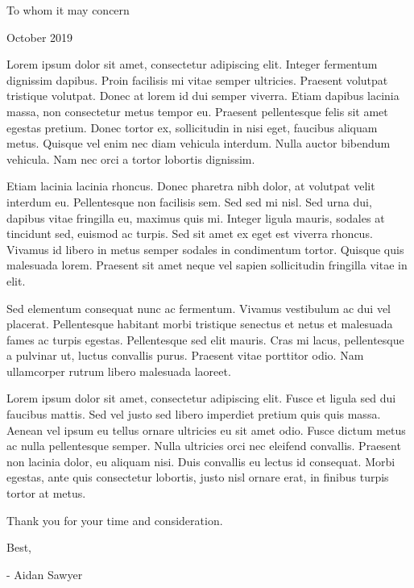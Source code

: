\documentclass{resume} %
\begin{document}
  \begin{rSection}{To whom it may concern}

    October 2019 \newline 
      
    Lorem ipsum dolor sit amet, consectetur adipiscing elit. Integer fermentum dignissim dapibus. Proin facilisis mi vitae semper ultricies. Praesent volutpat tristique volutpat. Donec at lorem id dui semper viverra. Etiam dapibus lacinia massa, non consectetur metus tempor eu. Praesent pellentesque felis sit amet egestas pretium. Donec tortor ex, sollicitudin in nisi eget, faucibus aliquam metus. Quisque vel enim nec diam vehicula interdum. Nulla auctor bibendum vehicula. Nam nec orci a tortor lobortis dignissim. 

Etiam lacinia lacinia rhoncus. Donec pharetra nibh dolor, at volutpat velit interdum eu. Pellentesque non facilisis sem. Sed sed mi nisl. Sed urna dui, dapibus vitae fringilla eu, maximus quis mi. Integer ligula mauris, sodales at tincidunt sed, euismod ac turpis. Sed sit amet ex eget est viverra rhoncus. Vivamus id libero in metus semper sodales in condimentum tortor. Quisque quis malesuada lorem. Praesent sit amet neque vel sapien sollicitudin fringilla vitae in elit.

Sed elementum consequat nunc ac fermentum. Vivamus vestibulum ac dui vel placerat. Pellentesque habitant morbi tristique senectus et netus et malesuada fames ac turpis egestas. Pellentesque sed elit mauris. Cras mi lacus, pellentesque a pulvinar ut, luctus convallis purus. Praesent vitae porttitor odio. Nam ullamcorper rutrum libero malesuada laoreet.

Lorem ipsum dolor sit amet, consectetur adipiscing elit. Fusce et ligula sed dui faucibus mattis. Sed vel justo sed libero imperdiet pretium quis quis massa. Aenean vel ipsum eu tellus ornare ultricies eu sit amet odio. Fusce dictum metus ac nulla pellentesque semper. Nulla ultricies orci nec eleifend convallis. Praesent non lacinia dolor, eu aliquam nisi. Duis convallis eu lectus id consequat. Morbi egestas, ante quis consectetur lobortis, justo nisl ornare erat, in finibus turpis tortor at metus. \newline 

    Thank you for your time and consideration. \newline 

    Best, 

    - Aidan Sawyer

  \end{rSection}
\end{document}

